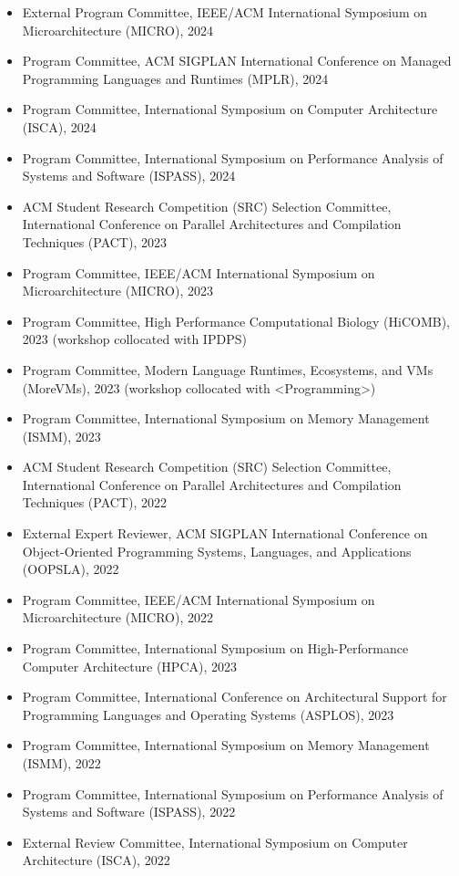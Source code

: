\documentclass[singlecolumn,singlespace,11pt]{article}
\begin{document}
\begin{itemize}
\item External Program Committee, IEEE/ACM International Symposium on Microarchitecture (MICRO), 2024
\item Program Committee, ACM SIGPLAN International Conference on Managed Programming Languages and Runtimes (MPLR), 2024
\item Program Committee, International Symposium on Computer Architecture (ISCA), 2024
\item Program Committee, International Symposium on Performance Analysis of Systems and Software (ISPASS), 2024
\item ACM Student Research Competition (SRC) Selection Committee, International Conference on Parallel Architectures and Compilation Techniques (PACT), 2023
\item Program Committee, IEEE/ACM International Symposium on Microarchitecture (MICRO), 2023
\item Program Committee, High Performance Computational Biology (HiCOMB), 2023 (workshop collocated with IPDPS)
\item Program Committee, Modern Language Runtimes, Ecosystems, and VMs (MoreVMs), 2023 (workshop collocated with <Programming>) 
\item Program Committee, International Symposium on Memory Management (ISMM), 2023
\item ACM Student Research Competition (SRC) Selection Committee, International Conference on Parallel Architectures and Compilation Techniques (PACT), 2022
\item External Expert Reviewer, ACM SIGPLAN International Conference on Object-Oriented Programming Systems, Languages, and Applications (OOPSLA), 2022
\item Program Committee, IEEE/ACM International Symposium on Microarchitecture (MICRO), 2022
\item Program Committee, International Symposium on High-Performance Computer Architecture (HPCA), 2023
\item Program Committee, International Conference on Architectural Support for Programming Languages and Operating Systems (ASPLOS), 2023
\item Program Committee, International Symposium on Memory Management (ISMM), 2022
\item Program Committee, International Symposium on Performance Analysis of Systems and Software (ISPASS), 2022
\item External Review Committee, International Symposium on Computer Architecture (ISCA), 2022

\end{itemize}
\end{document}
